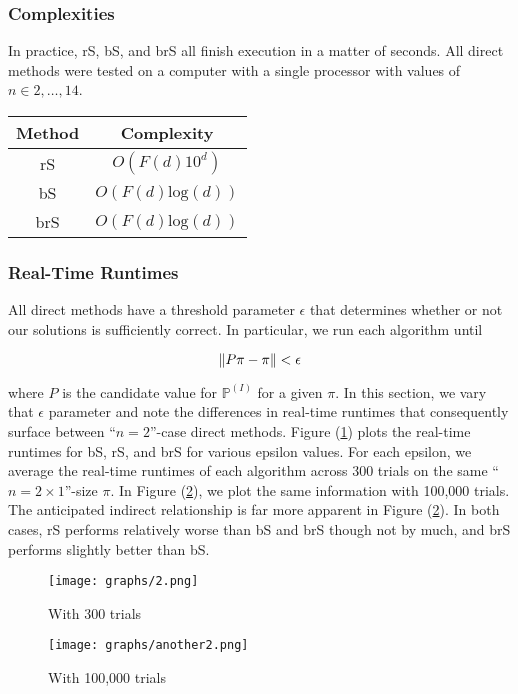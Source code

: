 \documentclass{article}
\DeclarePairedDelimiter\norm{\lVert}{\rVert}
\begin{document}
\subsubsection{Complexities}
In practice, rS, bS, and brS all finish execution in a matter of seconds. All direct methods were tested on a computer with a single processor with values of $n \in {2, \dots, 14}$.

\begin{center}
\begin{tabular}{c|c}
    Method & Complexity \\
    \hline
    rS & $O(F(d)10^d)$ \\
    bS & $O(F(d)\text{log}(d))$ \\
    brS & $O(F(d)\text{log}(d))$
\end{tabular}
\end{center}

\subsubsection{Real-Time Runtimes}
All direct methods have a threshold parameter $\epsilon$ that determines whether or not our solutions is sufficiently correct. In particular, we run each algorithm until

\[
\norm{P\pi - \pi} < \epsilon
\]

where $P$ is the candidate value for $\mathbb{P}^{(I)}$ for a given $\pi$. In this section, we vary that $\epsilon$ parameter and note the differences in real-time runtimes that consequently surface between ``$n=2$''-case direct methods. Figure (\ref{fig:2,300}) plots the real-time runtimes for bS, rS, and brS for various epsilon values. For each epsilon, we average the real-time runtimes of each algorithm across 300 trials on the same ``$n=2 \times 1$''-size $\pi$. In Figure (\ref{fig:2,100k}), we plot the same information with 100,000 trials. The anticipated indirect relationship is far more apparent in Figure (\ref{fig:2,100k}). In both cases, rS performs relatively worse than bS and brS though not by much, and brS performs slightly better than bS.

\begin{center}
    \begin{figure}[h!]
      \centering
      \texttt{[image: graphs/2.png]}
      \caption{With 300 trials}
      \label{fig:2,300}
    \end{figure}

    \begin{figure}[h!]
      \centering
      \texttt{[image: graphs/another2.png]}
      \caption{With 100,000 trials}
      \label{fig:2,100k}
    \end{figure}
\end{center}
\end{document}
